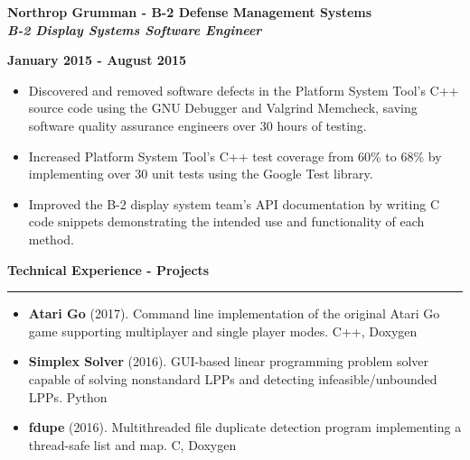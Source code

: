\documentclass[10pt,letterpaper]{article}
\begin{document}
\medskip

\begin{minipage}[t]{0.53\textwidth}
    \begin{flushleft}
        \textbf{Northrop Grumman - B-2 Defense Management Systems}\\
        \textbf{\textit{B-2 Display Systems Software Engineer}}\\
    \end{flushleft}
\end{minipage}
\begin{minipage}[t]{0.44\textwidth}
    \begin{flushright}
        \textbf{January 2015 - August 2015}
    \end{flushright}
\end{minipage}

\begin{itemize}[noitemsep,topsep=0pt]
    \setlength\itemsep{-0.10em}
    \item Discovered and removed software defects in the
        Platform System Tool's C++ source code using the GNU Debugger and Valgrind
        Memcheck, saving software quality assurance engineers over 30 hours of
        testing.
    \item Increased Platform System Tool's C++ test coverage from 60\% to 68\% by
        implementing over 30 unit tests using the Google Test library.
    \item Improved the B-2 display system team's API documentation by writing C code
        snippets demonstrating the intended use and functionality of each method.
\end{itemize}

\medskip

\begin{large}
    \textbf{Technical Experience - Projects}
\end{large}

\smallskip \hrule \smallskip

\begin{itemize}[topsep=0pt]
    \setlength\itemsep{-0.10em}
    \item \textbf{Atari Go} (2017). Command line implementation of the original Atari
        Go game supporting multiplayer and single player modes. C++, Doxygen
    \item \textbf{Simplex Solver} (2016). GUI-based linear programming problem solver
        capable of solving nonstandard LPPs and detecting infeasible/unbounded LPPs. Python
    \item \textbf{fdupe} (2016). Multithreaded file duplicate detection program implementing
        a thread-safe list and map. C, Doxygen
\end{itemize}
\end{document}
